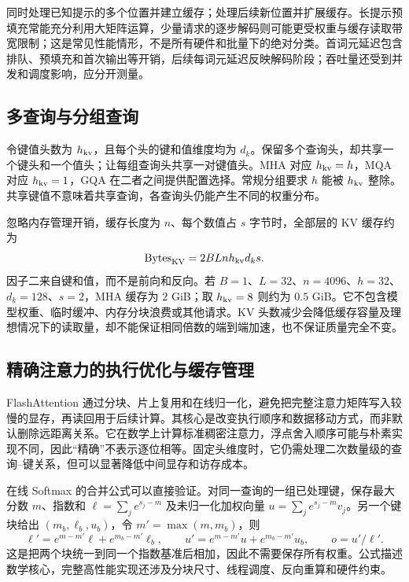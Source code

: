 \documentclass[UTF8,12pt,a4paper,fontset=fandol]{ctexart}
\begin{document}
同时处理已知提示的多个位置并建立缓存；处理后续新位置并扩展缓存。长提示预填充常能充分利用大矩阵运算，少量请求的逐步解码则可能更受权重与缓存读取带宽限制；这是常见性能情形，不是所有硬件和批量下的绝对分类。首词元延迟包含排队、预填充和首次输出等开销，后续每词元延迟反映解码阶段；吞吐量还受到并发和调度影响，应分开测量。

\subsection{多查询与分组查询}

令键值头数为 $h_{\rm kv}$，且每个头的键和值维度均为 $d_k$。保留多个查询头，却共享一个键头和一个值头；让每组查询头共享一对键值头。MHA 对应 $h_{\rm kv}=h$，MQA 对应 $h_{\rm kv}=1$，GQA 在二者之间提供配置选择\cite{ainslie2023}。常规分组要求 $h$ 能被 $h_{\rm kv}$ 整除。共享键值不意味着共享查询，各查询头仍能产生不同的权重分布。

忽略内存管理开销，缓存长度为 $n$、每个数值占 $s$ 字节时，全部层的 KV 缓存约为
\begin{equation}
\operatorname{Bytes}_{\rm KV}=2BLnh_{\rm kv}d_ks.
\label{eq:tr-kv-memory}
\end{equation}
因子二来自键和值，而不是前向和反向。若 $B=1$、$L=32$、$n=4096$、$h=32$、$d_k=128$、$s=2$，MHA 缓存为 $2$ GiB；取 $h_{\rm kv}=8$ 则约为 $0.5$ GiB。它不包含模型权重、临时缓冲、内存分块浪费或其他请求。KV 头数减少会降低缓存容量及理想情况下的读取量，却不能保证相同倍数的端到端加速，也不保证质量完全不变。

\subsection{精确注意力的执行优化与缓存管理}

FlashAttention 通过分块、片上复用和在线归一化，避免把完整注意力矩阵写入较慢的显存，再读回用于后续计算\cite{dao2022}。其核心是改变执行顺序和数据移动方式，而非默认删除远距离关系。它在数学上计算标准稠密注意力，浮点舍入顺序可能与朴素实现不同，因此“精确”不表示逐位相等。固定头维度时，它仍需处理二次数量级的查询--键关系，但可以显著降低中间显存和访存成本。

在线 Softmax 的合并公式可以直接验证。对同一查询的一组已处理键，保存最大分数 $m$、指数和 $\ell=\sum_j e^{s_j-m}$ 及未归一化加权向量 $u=\sum_j e^{s_j-m}v_j$。另一个键块给出 $(m_b,\ell_b,u_b)$，令 $m'=\max(m,m_b)$，则
\begin{equation}
\ell'=e^{m-m'}\ell+e^{m_b-m'}\ell_b,\qquad
u'=e^{m-m'}u+e^{m_b-m'}u_b,
\qquad o=u'/\ell'.
\label{eq:tr-online-softmax}
\end{equation}
这是把两个块统一到同一个指数基准后相加，因此不需要保存所有权重。公式描述数学核心，完整高性能实现还涉及分块尺寸、线程调度、反向重算和硬件约束。
\end{document}

